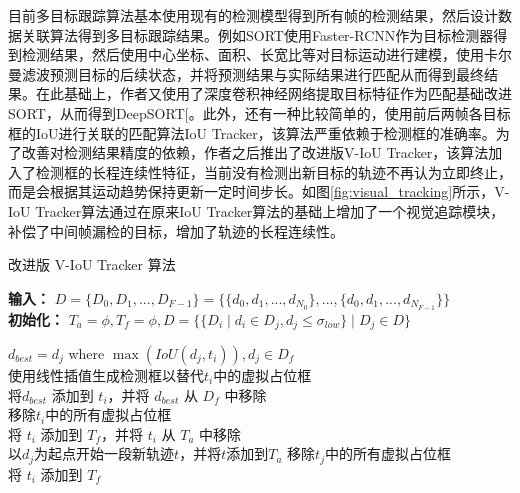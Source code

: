 

目前多目标跟踪算法基本使用现有的检测模型得到所有帧的检测结果，然后设计数据关联算法得到多目标跟踪结果。例如SORT\cite{bewley2016simple}使用Faster-RCNN\cite{ren2015faster}作为目标检测器得到检测结果，然后使用中心坐标、面积、长宽比等对目标运动进行建模，使用卡尔曼滤波预测目标的后续状态，并将预测结果与实际结果进行匹配从而得到最终结果。在此基础上，作者又使用了深度卷积神经网络提取目标特征作为匹配基础改进SORT，从而得到DeepSORT[\cite{wojke2017simple}。此外，还有一种比较简单的，使用前后两帧各目标框的IoU进行关联的匹配算法IoU Tracker\cite{bochinski2017high}，该算法严重依赖于检测框的准确率。为了改善对检测结果精度的依赖，作者之后推出了改进版V-IoU Tracker\cite{bochinski2018extending}，该算法加入了检测框的长程连续性特征，当前没有检测出新目标的轨迹不再认为立即终止，而是会根据其运动趋势保持更新一定时间步长。如图\ref{fig:visual_tracking}所示，V-IoU Tracker算法通过在原来IoU Tracker算法的基础上增加了一个视觉追踪模块，补偿了中间帧漏检的目标，增加了轨迹的长程连续性。

\begin{algorithm}[!t]
	\caption{改进版 V-IoU Tracker 算法}
	\label{alg:viou-tracker}
	\textbf{输入： }$D=\{D_0,D_1,...,D_{F-1}\} = \{\{d_0, d_1, ..., d_{N_0}\},..., \{d_0, d_1, ..., d_{N_{F-1}}\}\}$\\
	\textbf{初始化：} $T_a=\phi,T_f=\phi, D = \{\{D_i \mid d_i \in D_j, d_j \leq \sigma_{low}\} \mid D_j \in D\}$
	
	{
		{
			$d_{best} = d_j$ where $\max(IoU(d_j, t_i)), d_j \in D_f$\\
			{
				使用线性插值生成检测框以替代$t_i$中的虚拟占位框\\
				将$d_{best}$ 添加到 $t_i$，并将 $d_{best}$ 从 $D_f$ 中移除\\
			}
			{
				移除$t_i$中的所有虚拟占位框\\
				将 $t_i$ 添加到 $T_f$，并将 $t_i$ 从 $T_a$ 中移除\\
			}
		}
		{
			以$d_j$为起点开始一段新轨迹$t$，并将$t$添加到$T_a$
		}
	}
	{
		移除$t_j$中的所有虚拟占位框\\
		{	
			将 $t_i$ 添加到 $T_f$
		}
	}
\end{algorithm}

